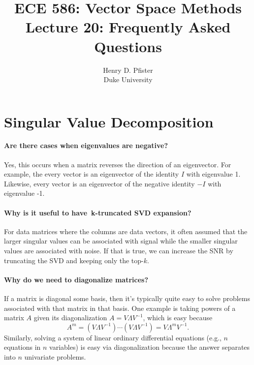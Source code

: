 \documentclass[10pt,english]{article}
\begin{document}
\title{ECE 586: Vector Space Methods \\ Lecture 20: Frequently Asked Questions}
\author{Henry D. Pfister \\ Duke University}

\maketitle

\section{Singular Value Decomposition}


\paragraph{Are there cases when eigenvalues are negative?}

Yes, this occurs when a matrix reverses the direction of an eigenvector.  For example, the every vector is an eigenvector of the identity $I$ with eigenvalue 1.  Likewise, every vector is an eigenvector of the negative identity $-I$ with eigenvalue -1. 

\paragraph{Why is it useful to have k-truncated SVD expansion?}

For data matrices where the columns are data vectors, it often assumed that the larger singular values can be associated with signal while the smaller singular values are associated with noise.
If that is true, we can increase the SNR by truncating the SVD and keeping only the top-$k$.


\paragraph{Why do we need to diagonalize matrices?}
 If a matrix is diagonal some basis, then it's typically quite easy to solve problems associated with that matrix in that basis.  One example is taking powers of a matrix $A$ given its diagonalization $A= V \Lambda V^{-1}$, which is easy because
 \[ A^m = (V \Lambda V^{-1}) \cdots (V \Lambda V^{-1}) = V \Lambda^m V^{-1}.  \]
 Similarly, solving a system of linear ordinary differential equations (e.g., $n$ equations in $n$ variables) is easy via diagonalization because the answer separates into $n$ univariate problems.
 
\end{document}
